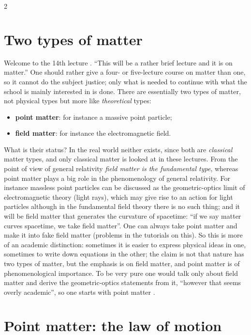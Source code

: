 \begin{paracol}{2}
\section{Two types of matter}\label{sec:c14-types}

Welcome to the 14th lecture . ``This will be a rather brief lecture and it is on matter.'' One should rather give a four- or five-lecture course on matter than one, so it cannot do the subject justice; only what is needed to continue with what the school is mainly interested in is done. There are essentially two types of matter, not physical types but more like \emph{theoretical} types:
\begin{itemize}
  \item \textbf{point matter}: for instance a massive point particle;
  \item \textbf{field matter}: for instance the electromagnetic field.
\end{itemize}
What is their status? In the real world neither exists, since both are \emph{classical} matter types, and only classical matter is looked at in these lectures. From the point of view of general relativity \emph{field matter is the fundamental type}, whereas point matter plays a big role in the phenomenology of general relativity. For instance massless point particles can be discussed as the geometric-optics limit of electromagnetic theory (light rays), which may give rise to an action for light particles although in the fundamental field theory there is no such thing; and it will be field matter that generates the curvature of spacetime: ``if we say matter curves spacetime, we take field matter''. One can always take point matter and make it into fake field matter (problems in the tutorials on this). So this is more of an academic distinction: sometimes it is easier to express physical ideas in one, sometimes to write down equations in the other; the claim is not that nature has two types of matter, but the emphasis is on field matter, and point matter is of phenomenological importance. To be very pure one would talk only about field matter and derive the geometric-optics statements from it, ``however that seems overly academic'', so one starts with point matter .

\section{Point matter: the law of motion}\label{sec:c14-point}


\end{paracol}
